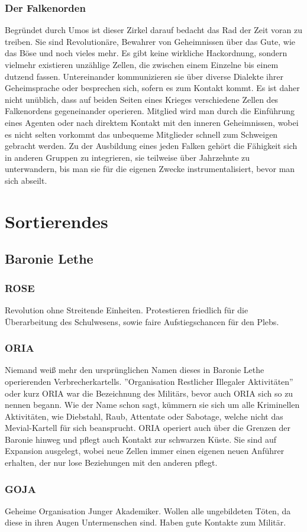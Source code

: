 \documentclass[a4paper,12pt,oneside]{book}
\begin{document}
\section{Der Falkenorden}
Begründet durch Umos ist dieser Zirkel darauf bedacht das Rad der Zeit voran zu treiben. Sie sind Revolutionäre, Bewahrer von Geheimnissen über das Gute, wie das Böse und noch vieles mehr. Es gibt keine wirkliche Hackordnung, sondern vielmehr existieren unzählige Zellen, die zwischen einem Einzelne bis einem dutzend fassen. Untereinander kommunizieren sie über diverse Dialekte ihrer Geheimsprache oder besprechen sich, sofern es zum Kontakt kommt. Es ist daher nicht unüblich, dass auf beiden Seiten eines Krieges verschiedene Zellen des Falkenordens gegeneinander operieren. Mitglied wird man durch die Einführung eines Agenten oder nach direktem Kontakt mit den inneren Geheimnissen, wobei es nicht selten vorkommt das unbequeme Mitglieder schnell zum Schweigen gebracht werden. Zu der Ausbildung eines jeden Falken gehört die Fähigkeit sich in anderen Gruppen zu integrieren, sie teilweise über Jahrzehnte zu unterwandern, bis man sie für die eigenen Zwecke instrumentalisiert, bevor man sich abseilt. 

\part{Sortierendes}

\chapter{Baronie Lethe}

\section{ROSE}
Revolution ohne Streitende Einheiten. Protestieren friedlich für die Überarbeitung des Schulwesens, sowie faire Aufstiegschancen für den Plebs.

\section{ORIA}
Niemand weiß mehr den ursprünglichen Namen dieses in Baronie Lethe operierenden Verbrecherkartells. ''Organisation Restlicher Illegaler Aktivitäten'' oder kurz ORIA war die Bezeichnung des Militärs, bevor auch ORIA sich so zu nennen begann. Wie der Name schon sagt, kümmern sie sich um alle Kriminellen Aktivitäten, wie Diebstahl, Raub, Attentate oder Sabotage, welche nicht das Mevial-Kartell für sich beansprucht. ORIA operiert auch über die Grenzen der Baronie hinweg und pflegt auch Kontakt zur schwarzen Küste. Sie sind auf Expansion ausgelegt, wobei neue Zellen immer einen eigenen neuen Anführer erhalten, der nur lose Beziehungen mit den anderen pflegt.

\section{GOJA}
Geheime Organisation Junger Akademiker. Wollen alle ungebildeten Töten, da diese in ihren Augen Untermenschen sind. Haben gute Kontakte zum Militär.
   
\section{}
\end{document}
